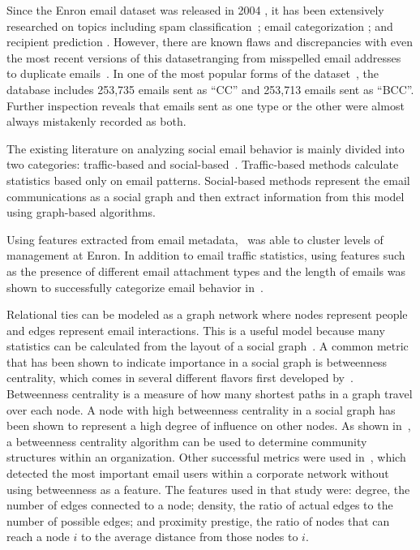 \documentclass[10pt,twocolumn,conference]{IEEEtran}
\begin{document}
Since the Enron email dataset was released in 2004 \cite{klimt_introducing_2004}, it has been extensively researched on topics including spam classification~\cite{martin_analyzing_2005}; email categorization \cite{he_novel_2014}; and recipient prediction \cite{sofershtein_predicting_2015}.  However, there are known flaws and discrepancies with even the most recent versions of this dataset\textemdash{}ranging from misspelled email addresses~\cite{nordbo_data_2014} to duplicate emails~\cite{waterman_big_2014}. In one of the most popular forms of the dataset~\cite{shetty_enron_2004}, the database includes 253,735 emails sent as ``CC'' and  253,713 emails sent as ``BCC''.  Further inspection reveals that emails sent as one type or the other were almost always mistakenly recorded as both.

The existing literature on analyzing social email behavior is mainly divided into two categories: traffic-based and social-based~\cite{tang_email_2013}.  Traffic-based methods calculate statistics based only on email patterns. Social-based methods represent the email communications as a social graph and then extract information from this model using graph-based algorithms.

Using features extracted from email metadata,~\cite{yelupula_social_2008} was able to cluster levels of management at Enron. In addition to email traffic statistics, using features such as the presence of different email attachment types and the length of emails was shown to successfully categorize email behavior in~\cite{martin_analyzing_2005}.

Relational ties can be modeled as a graph network where nodes represent people and edges represent email interactions.  This is a useful model because many statistics can be calculated from the layout of a social graph~\cite{wasserman_social_1994}.  A common metric that has been shown to indicate importance in a social graph is betweenness centrality, which comes in several different flavors first developed by~\cite{freeman_set_1977}.  Betweenness centrality is a measure of how many shortest paths in a graph travel over each node.  A node with high betweenness centrality in a social graph has been shown to represent a high degree of influence on other nodes.  As shown in~\cite{tyler_email_2003}, a betweenness centrality algorithm can be used to determine community structures within an organization.  Other successful metrics were used in~\cite{wilson_discovery_2009}, which detected the most important email users within a corporate network without using betweenness as a feature.  The features used in that study were: degree, the number of edges connected to a node; density, the ratio of actual edges to the number of possible edges; and proximity prestige, the ratio of nodes that can reach a node $i$ to the average distance from those nodes to $i$.
\end{document}
